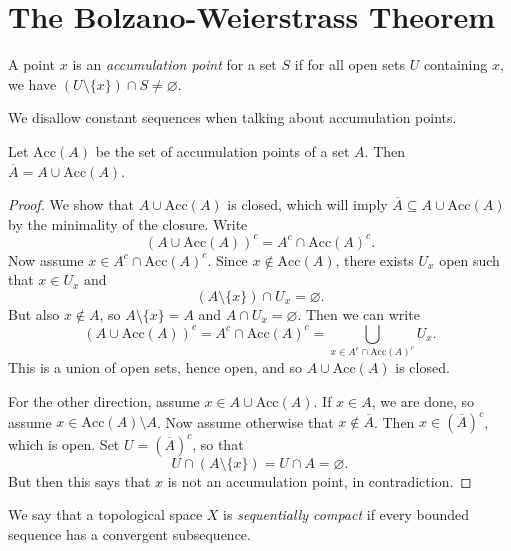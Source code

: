 \section{The Bolzano-Weierstrass Theorem}
\begin{definition}
  A point $x$ is an \emph{accumulation point}
  for a set $S$ if for all open sets $U$ containing
  $x$, we have
  $(U \setminus \{x\}) \cap S \ne \varnothing$.
\end{definition}

\begin{remark}
  We disallow constant sequences when talking about
  accumulation points.
\end{remark}

\begin{prop}
  Let $\mathrm{Acc}(A)$ be the set of accumulation
  points of a set $A$. Then $\overline{A} = A \cup \mathrm{Acc}(A)$.
\end{prop}

\begin{proof}
  We show that $A \cup \mathrm{Acc}(A)$ is closed,
  which will imply $\overline{A} \subseteq A \cup \mathrm{Acc}(A)$
  by the minimality of the closure. Write
  \[
    (A \cup \mathrm{Acc}(A))^c = A^c \cap \mathrm{Acc}(A)^c.
  \]
  Now assume $x \in A^c \cap \mathrm{Acc}(A)^c$.
  Since $x \notin \mathrm{Acc}(A)$, there exists
  $U_x$ open such that $x \in U_x$ and
  \[(A \setminus \{x\}) \cap U_x = \varnothing.\]
  But also $x \notin A$, so $A \setminus \{x\} = A$
  and $A \cap U_x = \varnothing$. Then we can write
  \[
    (A \cup \mathrm{Acc}(A))^c
    = A^c \cap \mathrm{Acc}(A)^c
    = \bigcup_{x \in A^c \cap \mathrm{Acc}(A)^c} U_x.
  \]
  This is a union of open sets, hence open, and
  so $A \cup \mathrm{Acc}(A)$ is closed.

  For the other direction, assume $x \in A \cup \mathrm{Acc}(A)$.
  If $x \in A$, we are done, so assume
  $x \in \mathrm{Acc}(A) \setminus A$. Now assume
  otherwise that $x \notin \overline{A}$.
  Then $x \in (\overline{A})^c$, which is open.
  Set $U = (\overline{A})^c$, so that
  \[
    U \cap (A \setminus \{x\}) = U \cap A = \varnothing.
  \]
  But then this says that $x$ is not an accumulation
  point, in contradiction.
\end{proof}

\begin{definition}
  We say that a topological space $X$ is \emph{sequentially compact} if
  every bounded sequence has a convergent
  subsequence.
\end{definition}

